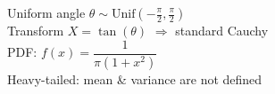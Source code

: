 \documentclass[preview]{standalone}
\begin{document}
Uniform angle $\theta \sim \text{Unif}(-\tfrac{\pi}{2}, \tfrac{\pi}{2})$\\Transform $X = \tan(\theta)$ $\Rightarrow$ standard Cauchy\\PDF: $f(x) = \dfrac{1}{\pi\left(1 + x^2\right)}$\\Heavy-tailed: mean \& variance are not defined\\
\end{document}
